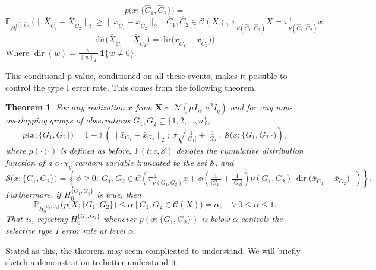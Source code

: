 \documentclass[11pt,a4paper]{article}
\newcommand{\Hzero}{H_0^{\{\hat{C}_1,\hat{C}_2\}}} %
\newtheorem{theorem}{Theorem}
\begin{document}
\[
p\big(x; \{\hat C_1, \hat C_2\}\big)
=\]
\[\mathbb{P}_{\Hzero}\Big(
\big\|\bar X_{\hat C_1} - \bar X_{\hat C_2}\big\|_2 \ge \big\|\bar x_{\hat C_1} - \bar x_{\hat C_2}\big\|_2
\;\Big|\;
\hat C_1, \hat C_2 \in \mathcal{C}(X),\;
\pi^{\perp}_{\nu(\hat C_1,\hat C_2)} X = \pi^{\perp}_{\nu(\hat C_1,\hat C_2)} x,\;\]
\[
\mathrm{dir}\big(\bar X_{\hat C_1} - \bar X_{\hat C_2}\big) = \mathrm{dir}\big(\bar x_{\hat C_1} - \bar x_{\hat C_2}\big)
\Big)
\]
Where $\operatorname{dir}(w) = \frac{w}{\|w\|_2}\,\mathbf{1}\{w \neq 0\}$.

This conditional p-value, conditioned on all these events, makes it possible to control the type I error rate. This comes from the following theorem. 

\begin{theorem}
For any realization $x$ from $\mathbf{X} \sim \mathcal{N}(\mu I_n, \sigma^2 I_q)$ and for any non-overlapping groups of observations $G_1, G_2 \subseteq \{1,2,\ldots,n\}$,
\begin{equation}
p\big(x; \{G_1,G_2\}\big) = 1 - \mathbb{F}\!\left(\big\|\bar x_{G_1} - \bar x_{G_2}\big\|_2;\ \sigma\sqrt{\tfrac{1}{|G_1|} + \tfrac{1}{|G_2|}},\ \mathcal{S}\big(x; \{G_1,G_2\}\big)\right),
\end{equation}
where $p(\cdot\,;\cdot)$ is defined as before, $\mathbb{F}(t; c, \mathcal{S})$ denotes the cumulative distribution function of a $c\cdot\chi_q$ random variable truncated to the set $\mathcal{S}$, and
\begin{equation}
\mathcal{S}\big(x; \{G_1,G_2\}\big) = \left\{ \phi \ge 0 :\ G_1, G_2 \in \mathcal{C}\!\left( \pi^{\perp}_{\nu(G_1,G_2)} x + \phi \left(\tfrac{1}{|G_1|} + \tfrac{1}{|G_2|}\right)\nu(G_1,G_2)\, \operatorname{dir}\big(\bar x_{G_1} - \bar x_{G_2}\big)^{\!\top} \right) \right\}.
\end{equation}
Furthermore, if $H_0^{\{G_1,G_2\}}$ is true, then
\begin{equation}
\mathbb{P}_{H_0^{\{G_1,G_2\}}}\Big( p\big(X; \{G_1,G_2\}\big) \le \alpha \ \Big|\ G_1, G_2 \in \mathcal{C}(X) \Big) = \alpha, \quad \forall\, 0 \le \alpha \le 1.
\end{equation}
That is, rejecting $H_0^{\{G_1,G_2\}}$ whenever $p(x; \{G_1,G_2\})$ is below $\alpha$ controls the selective type I error rate at level $\alpha$.
\end{theorem}

Stated as this, the theorem may seem complicated to understand. We will briefly sketch a demonstration to better understand it.
\end{document}
